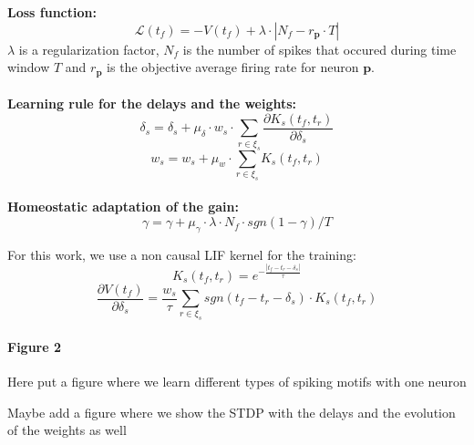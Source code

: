 \documentclass[11pt]{article}
\newcommand{\arank}{r} %
\newcommand{\synapticweight}{w} %
\newcommand{\synapticdelay}{\delta} %
\newcommand{\ranksyn}{s} %
\newcommand{\timev}{t} %
\newcommand{\eventstream}{\xi} %
\newcommand{\channel}{\mathbf{p}} %
\newcommand{\mempot}{V} %
\newcommand{\gain}{\gamma} %
\newcommand{\kernel}{K} %
\newcommand{\loss}{\mathcal{L}} %
\newcommand{\firerank}{f}
\newcommand{\learningrate}{\mu}
\begin{document}
\begin{multicols}{2}
\columnbreak
\noindent \textbf{Loss function:}
%
\begin{equation}\label{eq:loss}
\loss(\timev_\firerank) = -\mempot(\timev_\firerank) + \lambda \cdot \left| N_\firerank - r_\channel \cdot T \right|
\end{equation}
$\lambda$ is a regularization factor, $N_\firerank$ is the number of spikes that occured during time window $T$ and $r_\channel$ is the objective average firing rate for neuron $\channel$.\\
%
\\
\textbf{Learning rule for the delays and the weights:}
%
\begin{equation}\label{eq:delay}
\synapticdelay_\ranksyn = \synapticdelay_\ranksyn + \learningrate_\synapticdelay \cdot \synapticweight_\ranksyn \cdot \sum_{\arank \in \eventstream_\ranksyn} \frac{\partial \kernel_\ranksyn(\timev_\firerank, t_\arank)}{\partial \synapticdelay_\ranksyn}
\end{equation}
%
\begin{equation}\label{eq:weight}
\synapticweight_\ranksyn = \synapticweight_\ranksyn + \learningrate_\synapticweight \cdot \sum_{\arank \in \eventstream_\ranksyn} \kernel_\ranksyn(\timev_\firerank, t_\arank)
\end{equation}
\\
\textbf{Homeostatic adaptation of the gain:}
\begin{equation}\label{eq:gain}
\gain = \gain + \learningrate_\gain \cdot \lambda \cdot N_\firerank \cdot sgn(1-\gain)/T
\end{equation}

For this work, we use a non causal LIF kernel for the training:
\begin{equation}\label{eq:nclk}
\kernel_\ranksyn(\timev_\firerank, \timev_\arank) = e^{-\frac{\left| \timev_\firerank-\timev_\arank-\synapticdelay_\ranksyn \right|}{\tau}}
\end{equation}
$$\frac{\partial \mempot(\timev_\firerank)}{\partial \synapticdelay_\ranksyn} = \frac{\synapticweight_\ranksyn}{\tau} \sum_{\arank \in \eventstream_\ranksyn}sgn(\timev_\firerank-\timev_\arank-\synapticdelay_\ranksyn) \cdot \kernel_\ranksyn(\timev_\firerank, \timev_\arank)$$
\end{multicols}
%

\paragraph*{Figure 2}
Here put a figure where we learn different types of spiking motifs with one neuron

Maybe add a figure where we show the STDP with the delays and the evolution of the weights as well
%
\printbibliography
\end{document}
